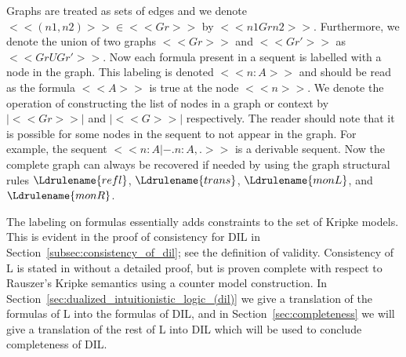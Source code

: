 Graphs are treated as sets of edges and we denote $<<(n1,n2)>> \in
<<Gr>>$ by $<<n1 Gr n2>>$.  Furthermore, we denote the union of two
graphs $<<Gr>>$ and $<<Gr'>>$ as $<<Gr U Gr'>>$. Now each formula
present in a sequent is labelled with a node in the graph.  This
labeling is denoted $<<n : A>>$ and should be read as the formula
$<<A>>$ is true at the node $<<n>>$.  We denote the operation of
constructing the list of nodes in a graph or context by $|<<Gr>>|$
and $|<<G>>|$ respectively. The reader should note that it is possible
for some nodes in the sequent to not appear in the graph.  For
example, the sequent $<<n : A |- . n : A,.>>$ is a derivable sequent.
Now the complete graph can always be recovered if needed by using the
graph structural rules $\Ldrulename{refl}$, $\Ldrulename{trans}$,
$\Ldrulename{monL}$, and $\Ldrulename{monR}$.

The labeling on formulas essentially adds constraints to the set of
Kripke models.  This is evident in the proof of consistency for DIL in
Section~\ref{subsec:consistency_of_dil}; see the definition of
validity. Consistency of L is stated in \cite{Pinto:2009} without a
detailed proof, but is proven complete with respect to Rauszer's
Kripke semantics using a counter model construction.  In
Section~\ref{sec:dualized_intuitionistic_logic_(dil)} we give a
translation of the formulas of L into the formulas of DIL, and in
Section~\ref{sec:completeness} we will give a translation of the rest
of L into DIL which will be used to conclude completeness of DIL.

